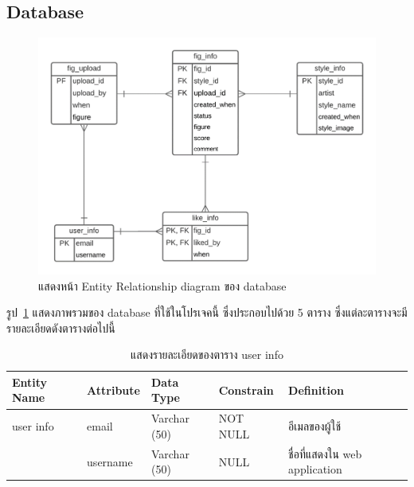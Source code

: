 \documentclass[12pt,oneside,openright,a4paper]{cpe-thai-project}
\begin{document}
\subsection{Database}
\begin{figure}[!h]
  \centering
  \includegraphics[width=15cm]{./image/database.png}
  \caption{แสดงหน้า Entity Relationship diagram ของ database}
  \label{fig:database}
\end{figure}
\par\setlength{\parindent}{5ex}
รูป~\ref{fig:database} แสดงภาพรวมของ database ที่ใช้ในโปรเจคนี้ ซึ่งประกอบไปด้วย 5 ตาราง ซึ่งแต่ละตารางจะมีรายละเอียดดังตารางต่อไปนี้

\begin{table}[!h]
  \caption{แสดงรายละเอียดของตาราง user info}\label{tbl:user_info}
  \begin{tabular}{|l|l|l|l|l|}
  \hline
  \rowcolor[HTML]{DAE8FC} 
  Entity Name & Attribute & Data Type    & Constrain & Definition                        \\ \hline
  user info   & email     & Varchar (50) & NOT NULL  & อีเมลของผู้ใช้                    \\ \hline
              & username  & Varchar (50) & NULL      & ชื่อที่แสดงใน   web   application \\ \hline
  \end{tabular}
\end{table}
\end{document}
